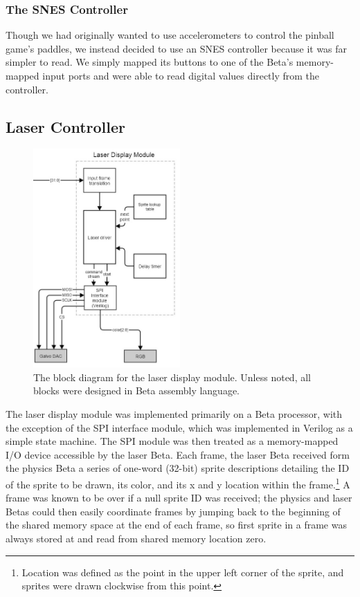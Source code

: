 \documentclass{article}
\begin{document}
\subsubsection{The SNES Controller}
Though we had originally wanted to use accelerometers to control the pinball game's paddles, we instead decided to use an SNES controller because it was far simpler to read. We simply mapped its buttons to one of the Beta's memory-mapped input ports and were able to read digital values directly from the controller.

\subsection{Laser Controller} \label{laser}

\begin{figure}[H]
\begin{center}
\includegraphics[width=0.5\textwidth]{laser}
\caption{The block diagram for the laser display module. Unless noted, all blocks were designed in Beta assembly language.}
\end{center}
\end{figure}

The laser display module was implemented primarily on a Beta processor, with the exception of the SPI interface module, which was implemented in Verilog as a simple state machine. The SPI module was then treated as a memory-mapped I/O device accessible by the laser Beta. Each frame, the laser Beta received form the physics Beta a series of one-word (32-bit) sprite descriptions detailing the ID of the sprite to be drawn, its color, and its x and y location within the frame.\footnote{Location was defined as the point in the upper left corner of the sprite, and sprites were drawn clockwise from this point.} A frame was known to be over if a null sprite ID was received; the physics and laser Betas could then easily coordinate frames by jumping back to the beginning of the shared memory space at the end of each frame, so first sprite in a frame was always stored at and read from shared memory location zero.
\end{document}

